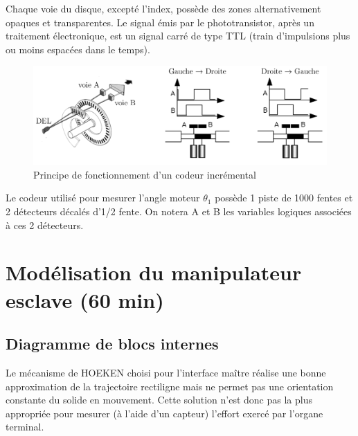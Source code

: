 Chaque voie du disque, excepté l'index, possède des zones alternativement opaques et transparentes. Le signal émis par le phototransistor, après un traitement électronique, est un signal
carré de type TTL (train d'impulsions plus ou moins espacées dans le temps).

\begin{figure}[ht!]
\begin{center}
 \includegraphics[width=0.9\linewidth]{img/Figure10b}
\end{center}
\caption{Principe de fonctionnement d'un codeur incrémental}
\label{fig10b}
\end{figure}

Le codeur utilisé pour mesurer l'angle moteur $\theta_1$ possède 1 piste de 1000 fentes et 2 détecteurs décalés d'1/2 fente. On notera A et B les variables logiques associées à ces 2 détecteurs.


\section{Modélisation du manipulateur esclave (60 min)}

\subsection{Diagramme de blocs internes}

Le mécanisme de HOEKEN choisi pour l'interface maître réalise une bonne approximation de la trajectoire rectiligne mais ne permet pas une orientation constante du solide en mouvement. Cette solution n'est donc pas la plus appropriée pour mesurer (à l'aide d'un capteur) l'effort exercé par l'organe terminal.

